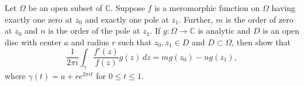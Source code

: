 \documentclass[12pt]{article}
\begin{document}
\begin{tcolorbox}[colback=problemcol, title=\textbf{Problem}]
Let $\Omega$ be an open subset of $\mathbb{C}$. Suppose $f$ is a meromorphic function on $\Omega$ having exactly one zero at $z_0$ and exactly one pole at $z_1$. Further, $m$ is the order of zero at $z_0$ and $n$ is the order of the pole at $z_1$. If $g : \Omega \to \mathbb{C}$ is analytic and $D$ is an open disc with center $a$ and radius $r$ such that $z_0, z_1 \in D$ and $D \subset \Omega$, then show that
\[
\frac{1}{2\pi i} \int_\gamma \frac{f'(z)}{f(z)} g(z)\, dz = m g(z_0) - n g(z_1),
\]
where $\gamma(t) = a + r e^{2\pi i t}$ for $0 \le t \le 1$.
\end{tcolorbox}

\vspace{1em}
\end{document}
